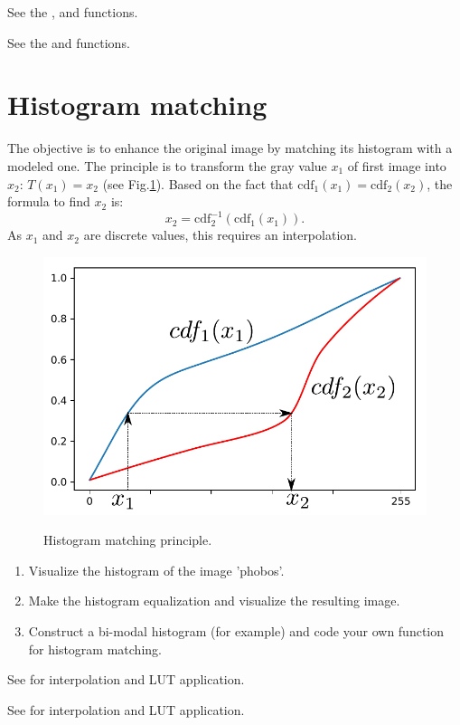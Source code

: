 \begin{mcomment}
\begin{mremark}
See the ,  and  functions.
\end{mremark}
\end{mcomment}

\begin{pcomment}
\begin{premark}
See the  and   functions.
\end{premark}
\end{pcomment}

\section{Histogram matching}
The objective is to enhance the original image by matching its histogram with a modeled one. The principle is to transform the gray value $x_1$ of first image into $x_2$: $T(x_1)=x_2$ (see Fig.\ref{fig:enhancement:enonce:histmatching}). Based on the fact that $\mathrm{cdf}_1(x_1)=\mathrm{cdf}_2(x_2)$, the formula to find $x_2$ is: $$x_2=\mathrm{cdf}_2^{-1}\left(\mathrm{cdf}_1(x_1)\right).$$ 
As $x_1$ and $x_2$ are discrete values, this requires an interpolation.

\begin{figure}[htbp]
 \centering\caption{Histogram matching principle.}%
 \includegraphics[width=.5\linewidth]{histmatching.pdf}%
 \label{fig:enhancement:enonce:histmatching}%
\end{figure}


\begin{qbox}
\begin{enumerate}
	\item Visualize the histogram of the image 'phobos'.
	\item Make the histogram equalization and visualize the resulting image.
	\item Construct a bi-modal histogram (for example) and code your own function for histogram matching.
\end{enumerate}
\end{qbox}

\begin{mcomment}
\begin{mremark}
See  for interpolation and LUT application.
\end{mremark}
\end{mcomment}

\begin{pcomment}
\begin{premark}
See  for interpolation and LUT application.
\end{premark}
\end{pcomment}
